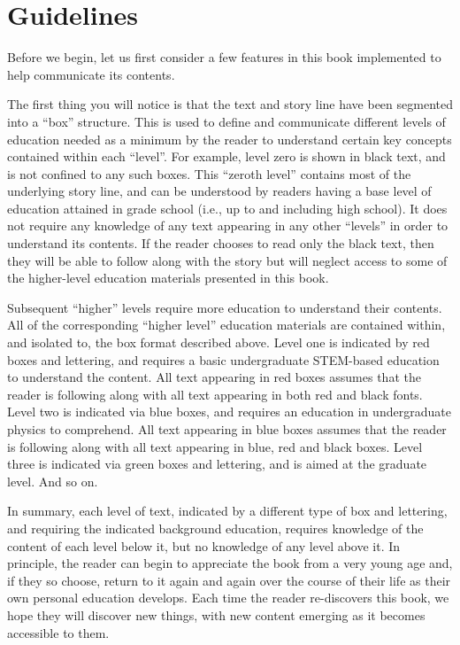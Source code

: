\documentclass[main.tex]{subfiles}
\begin{document}
\section{Guidelines} \label{guide}

\par \nar Before we begin, let us first consider a few features in this book implemented to help communicate its contents.  


The first thing you will notice is that the text and story line have been segmented into a “box” structure.  This is used to define and communicate different levels of education needed as a minimum by the reader to understand certain key concepts contained within each “level”.  For example, level zero is shown in black text, and is not confined to any such boxes.  This “zeroth level” contains most of the underlying story line, and can be understood by readers having a base level of education attained in grade school (i.e., up to and including high school).  It does not require any knowledge of any text appearing in any other “levels” in order to understand its contents.  If the reader chooses to read only the black text, then they will be able to follow along with the story but will neglect access to some of the higher-level education materials presented in this book.  

Subsequent “higher” levels require more education to understand their contents.  All of the corresponding “higher level” education materials are contained within, and isolated to, the box format described above.  Level one is indicated by red boxes and lettering, and requires a basic undergraduate STEM-based education to understand the content.  All text appearing in red boxes assumes that the reader is following along with all text appearing in both red and black fonts.  Level two is indicated via blue boxes, and requires an education in undergraduate physics to comprehend.  All text appearing in blue boxes assumes that the reader is following along with all text appearing in blue, red and black boxes.  Level three is indicated via green boxes and lettering, and is aimed at the graduate level.  And so on.  

In summary, each level of text, indicated by a different type of box and lettering, and requiring the indicated background education, requires knowledge of the content of each level below it, but no knowledge of any level above it.  In principle, the reader can begin to appreciate the book from a very young age and, if they so choose, return to it again and again over the course of their life as their own personal education develops.  Each time the reader re-discovers this book, we hope they will discover new things, with new content emerging as it becomes accessible to them.
\end{document}
